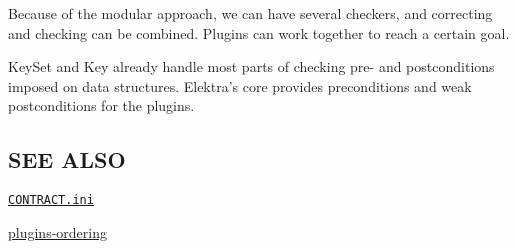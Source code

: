 Because of the modular approach, we can have several checkers, and correcting and checking can be combined. Plugins can work together to reach a certain goal.

{\ttfamily Key\+Set} and {\ttfamily Key} already handle most parts of checking pre-\/ and postconditions imposed on data structures. Elektra’s core provides preconditions and weak postconditions for the plugins.

\subsection*{S\+EE A\+L\+SO}


\begin{DoxyItemize}
\item \href{/home/markus/Projekte/Elektra/current/doc/CONTRACT.ini}{\tt C\+O\+N\+T\+R\+A\+C\+T.\+ini}
\item \hyperlink{doc_dev_plugins-ordering_md}{plugins-\/ordering} 
\end{DoxyItemize}